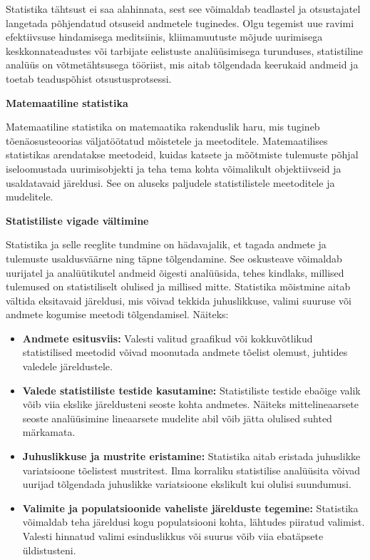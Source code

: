 \documentclass[
]{book}
\providecommand{\tightlist}{%
  \setlength{\itemsep}{0pt}\setlength{\parskip}{0pt}}
\begin{document}
Statistika tähtsust ei saa alahinnata, sest see võimaldab teadlastel ja otsustajatel langetada põhjendatud otsuseid andmetele tuginedes. Olgu tegemist uue ravimi efektiivsuse hindamisega meditsiinis, kliimamuutuste mõjude uurimisega keskkonnateadustes või tarbijate eelistuste analüüsimisega turunduses, statistiline analüüs on võtmetähtsusega tööriist, mis aitab tõlgendada keerukaid andmeid ja toetab teaduspõhist otsustusprotsessi.

\textbf{Matemaatiline statistika}

Matemaatiline statistika on matemaatika rakenduslik haru, mis tugineb tõenäosusteoorias väljatöötatud mõistetele ja meetoditele. Matemaatilises statistikas arendatakse meetodeid, kuidas katsete ja mõõtmiste tulemuste põhjal iseloomustada uurimisobjekti ja teha tema kohta võimalikult objektiivseid ja usaldatavaid järeldusi. See on aluseks paljudele statistilistele meetoditele ja mudelitele.

\textbf{Statistiliste vigade vältimine}

Statistika ja selle reeglite tundmine on hädavajalik, et tagada andmete ja tulemuste usaldusväärne ning täpne tõlgendamine. See oskusteave võimaldab uurijatel ja analüütikutel andmeid õigesti analüüsida, tehes kindlaks, millised tulemused on statistiliselt olulised ja millised mitte. Statistika mõistmine aitab vältida eksitavaid järeldusi, mis võivad tekkida juhuslikkuse, valimi suuruse või andmete kogumise meetodi tõlgendamisel. Näiteks:

\begin{itemize}
\tightlist
\item
  \textbf{Andmete esitusviis:} Valesti valitud graafikud või kokkuvõtlikud statistilised meetodid võivad moonutada andmete tõelist olemust, juhtides valedele järeldustele.
\item
  \textbf{Valede statistiliste testide kasutamine:} Statistiliste testide ebaõige valik võib viia ekslike järeldusteni seoste kohta andmetes. Näiteks mittelineaarsete seoste analüüsimine lineaarsete mudelite abil võib jätta olulised suhted märkamata.
\item
  \textbf{Juhuslikkuse ja mustrite eristamine:} Statistika aitab eristada juhuslikke variatsioone tõelistest mustritest. Ilma korraliku statistilise analüüsita võivad uurijad tõlgendada juhuslikke variatsioone ekslikult kui olulisi suundumusi.
\item
  \textbf{Valimite ja populatsioonide vaheliste järelduste tegemine:} Statistika võimaldab teha järeldusi kogu populatsiooni kohta, lähtudes piiratud valimist. Valesti hinnatud valimi esinduslikkus või suurus võib viia ebatäpsete üldistusteni.
\end{itemize}
\end{document}
